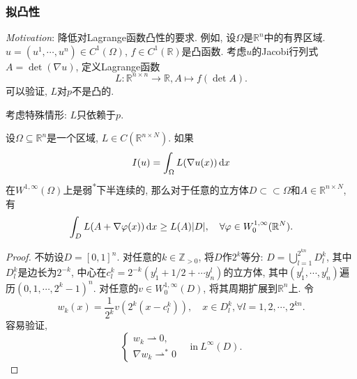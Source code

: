 \subsubsection{拟凸性}

\emph{Motivation}: 降低对Lagrange函数凸性的要求. 例如, 设$\Omega$是$\mathbb{R}^n$中的有界区域. 
$u = (u^1, \cdots, u^n) \in C^1(\Omega)$, $f \in C^1(\mathbb{R})$是凸函数.
考虑$u$的Jacobi行列式$A = \det (\nabla u)$, 定义Lagrange函数 
\begin{equation*}
    L\colon \mathbb{R}^{n \times n} \rightarrow \mathbb{R}, A \mapsto f(\det A).
\end{equation*}
可以验证, $L$对$p$不是凸的.

考虑特殊情形: $L$只依赖于$p$.

\begin{proposition}
    设$\Omega \subseteq \mathbb{R}^n$是一个区域, $L \in C(\mathbb{R}^{n \times N})$. 
    如果 
    \begin{equation*}
        I(u) = \int_{\Omega}L(\nabla u(x)) \,{\rm d}x
    \end{equation*}
    在$W^{1, \infty}(\Omega)$上是弱\textsuperscript{*}下半连续的, 那么对于任意的立方体$D \subset \subset \Omega$和$A \in \mathbb{R}^{n \times N}$, 有 
    \begin{equation*}
        \int_DL(A + \nabla\varphi(x)) \,{\rm d}x \geq L(A)|D|, \quad \forall \varphi \in W_0^{1, \infty}(\mathbb{R}^N).
    \end{equation*}
    \begin{proof}
        不妨设$D = [0, 1]^n$. 对任意的$k \in \mathbb{Z}_{> 0}$, 将$D$作$2^k$等分: $D = \bigcup_{l = 1}^{2^{kn}}D_l^k$, 其中$D_l^k$是边长为$2^{-k}$, 中心在$c_l^k = 2^{-k}(y_1^l + 1/2 + \cdots y_n^l)$的立方体,
        其中$(y_1^l, \cdots, y_n^l)$遍历$(0, 1, \cdots, 2^k - 1)^n$. 对任意的$v \in W_0^{1, \infty}(D)$, 将其周期扩展到$\mathbb{R}^n$上. 
        令 
        \begin{equation*}
            w_k(x) = \frac{1}{2^k}v(2^k(x - c_l^k)), \quad x \in D_l^k, \forall l = 1, 2, \cdots, 2^{kn}.
        \end{equation*}  
        容易验证,  
        \begin{equation*}
            \begin{cases}
                w_k \rightharpoonup 0, \\
                \nabla w_k \rightharpoonup^* 0
            \end{cases}
            \quad \text{in}\ L^{\infty}(D).
        \end{equation*}

\end{proof}
\end{proposition}
